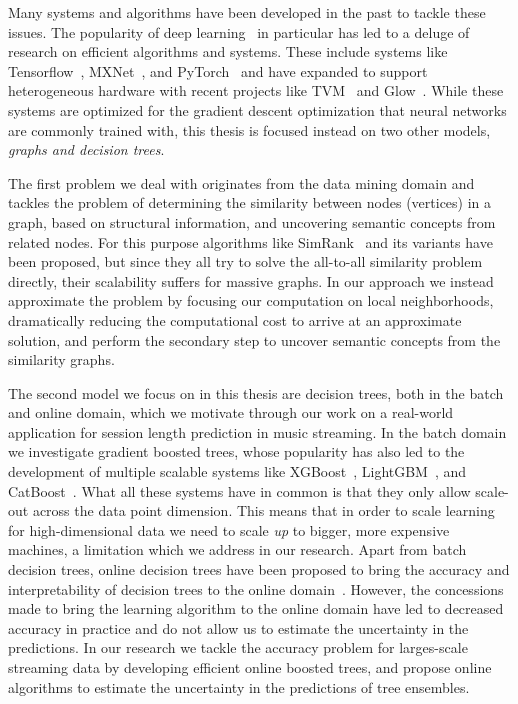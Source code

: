 Many systems and algorithms have been developed in the past to
tackle these issues. The popularity of deep learning~\cite{deep-learning}
in particular has led to a deluge of research on efficient
algorithms and systems. These include systems like Tensorflow~\cite{tensorflow},
MXNet~\cite{mxnet},
and PyTorch~\cite{pytorch} and have expanded to support heterogeneous hardware with recent projects
like TVM~\cite{tvm} and Glow~\cite{glow}. While these systems are optimized for the gradient
descent optimization that neural networks are commonly trained with,
this thesis is focused instead on two other models, \emph{graphs and decision
trees}.

The first problem we deal with originates
from the data mining domain and tackles the problem of determining the
similarity between nodes (vertices) in a graph, based on structural information,
and uncovering semantic concepts from related nodes.
For this purpose algorithms like SimRank~\cite{simrank} and its variants have been
proposed, but since they all try to solve the all-to-all similarity
problem directly, their scalability suffers for massive graphs.
In our approach we instead approximate the problem by focusing
our computation on local neighborhoods, dramatically reducing the
computational cost to arrive at an approximate solution, and perform
the secondary step to uncover semantic concepts from the similarity graphs.

The second model we focus on in this thesis are decision trees,
both in the batch and online domain, which we motivate through our
work on a real-world application for session length prediction in music streaming.
In the batch domain we investigate
gradient boosted trees, whose popularity has also led
to the development of multiple scalable systems like XGBoost~\cite{xgboost},
LightGBM~\cite{lightgbm}, and CatBoost~\cite{catboost}. What all these
systems have in common is that they only allow scale-out across
the data point dimension.  This means that in order to scale learning
for high-dimensional data we need to scale \emph{up} to bigger, more expensive
machines, a limitation which we address in our research. Apart from
batch decision trees, online decision trees have been proposed
to bring the accuracy and interpretability of decision trees to
the online domain~\cite{vfdt}. However, the concessions made to
bring the learning algorithm to the online domain have led to
decreased accuracy in practice and do not allow us to estimate the uncertainty
in the predictions. In our research we tackle the accuracy problem for
larges-scale streaming data by developing efficient online boosted trees,
and propose online algorithms to estimate the uncertainty in the
predictions of tree ensembles.

